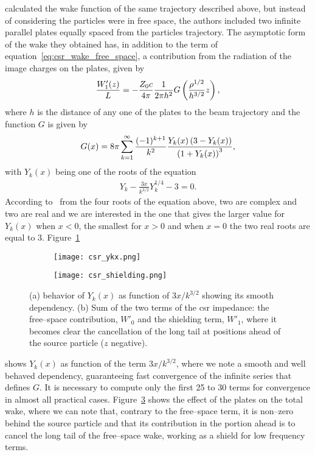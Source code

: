      calculated the wake function of the same trajectory described above, but instead of considering the particles were in free space, the authors included two infinite parallel plates equally spaced from the particles trajectory. The asymptotic form of the wake they obtained has, in addition to the term of equation~\eqref{eq:csr_wake_free_space}, a contribution from the radiation of the image charges on the plates, given by
    \begin{align}\label{eq:csr_wake_shielding}
        \frac{W'_1(z)}{L} = -\frac{Z_0 c}{4\pi}\frac{1}{2\pi h^2} G\left(\frac{\rho^{1/2}}{h^{3/2}}z\right),
    \end{align}
    where $h$ is the distance of any one of the plates to the beam trajectory and the function $G$ is given by
    \begin{align}
        G(x) = 8\pi\sum_{k=1}^\infty \frac{(-1)^{k+1}}{k^2}\frac{Y_k(x)\left(3-Y_k(x)\right)}{\left(1+Y_k(x)\right)^3},
    \end{align}
    with $Y_k(x)$ being one of the roots of the equation
    \begin{align}
        Y_k - \frac{3x}{k^{3/2}}Y_k^{1/4} - 3 = 0.
    \end{align}
    According to~ from the four roots of the equation above, two are complex and two are real and we are interested in the one that gives the larger value for $Y_k(x)$ when $x<0$, the smallest for $x>0$ and when $x=0$ the two real roots are equal to 3. Figure~\ref{fig:csr_ykx}
    \begin{figure}
        \centering
        \begin{subfigure}[c]{0.48\textwidth}
            \centering
            \texttt{[image: csr\_ykx.png]}
            \caption{}
            \label{fig:csr_ykx}
        \end{subfigure}\hfill
        \begin{subfigure}[c]{0.48\textwidth}
            \centering
            \texttt{[image: csr\_shielding.png]}
            \caption{}
            \label{fig:csr_shielding}
        \end{subfigure}
        \caption{(a) behavior of $Y_k(x)$ as function of $3x/k^{3/2}$ showing its smooth dependency. (b) Sum of the two terms of the \gls{csr} impedance: the free--space contribution, $W'_0$ and the shielding term, $W'_1$, where it becomes clear the cancellation of the long tail at positions ahead of the source particle ($z$ negative).}
    \end{figure}
    shows $Y_k(x)$ as function of the term $3x/k^{3/2}$, where we note a smooth and well behaved dependency, guaranteeing fast convergence of the infinite series that defines $G$. It is necessary to compute only the first 25 to 30 terms for convergence in almost all practical cases. Figure~\ref{fig:csr_shielding} shows the effect of the plates on the total wake, where we can note that, contrary to the free--space term, it is non--zero behind the source particle and that its contribution in the portion ahead is to cancel the long tail of the free--space wake, working as a shield for low frequency terms.

